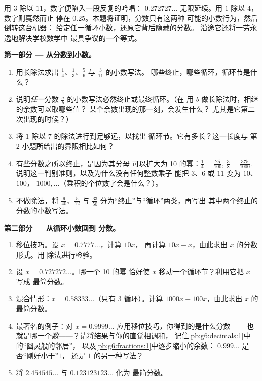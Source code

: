\begin{problem}
\label{pb:g9:fractions:1}
用 $3$ 除以 $11$，数字便陷入一段反复的吟唱：
$0.272727\ldots$ 无限延续。用 $1$ 除以 $4$，数字则戛然而止
停在 $0.25$。本题将证明，分数只有这两种
可能的小数行为，然后倒转这台机器：
给定任一循环小数，还原它背后隐藏的分数。
沿途它还将一劳永逸地解决学校数学中
最具争议的一个等式。

\medskip
\noindent\textbf{第一部分 --- 从分数到小数。}
\begin{enumerate}
  \item 用长除法求出
        $\frac14$、$\frac13$、$\frac56$ 与 $\frac{3}{11}$ 的小数写法。
        哪些终止，哪些循环，循环节是什么？
  \item 说明\emph{任一}分数
        $\frac ab$ 的小数写法必然终止或最终循环。（在
        用 $b$ 做长除法时，相继的余数可以取哪些值？
        某个余数出现的那一刻，会发生什么？
        尤其是它第二次出现的时候？）
  \item 将 $1$ 除以 $7$ 的除法进行到足够远，以找出
        循环节。它有多长？这一长度与
        第 2 小题所给出的界限相比如何？
  \item 有些分数之所以终止，是因为其分母
        可以扩大为 10 的幂：$\frac14 =
        \frac{25}{100}$, $\frac{3}{8} = \frac{375}{1000}$.
        说明这一判别准则，以及为什么没有任何整数乘子
        能把 $3$、$6$ 或 $11$ 变为 $10$、$100$，
        $1000, \dots$（乘积的个位数字会是什么？）。
  \item 不做除法，将 $\frac{9}{40}$、$\frac{5}{12}$ 与
        $\frac{33}{50}$ 分为“终止”与“循环”两类，再写出
        其中两个终止的分数的小数写法。
\end{enumerate}

\medskip
\noindent\textbf{第二部分 --- 从循环小数回到
分数。}
\begin{enumerate}[resume]
  \item 移位技巧。设 $x = 0.7777\ldots$，计算 $10x$，
        再计算 $10x - x$，由此求出 $x$ 的分数形式。用
        除法进行检验。
  \item 设 $x = 0.727272\ldots$。哪一个 10 的幂
        恰好使 $x$ 移动一个循环节？利用它把 $x$ 写成
        最简分数。
  \item 混合情形：$x = 0.58333\ldots$（只有 $3$
        循环）。计算 $1000x - 100x$，由此求出 $x$ 的
        最简分数。
  \item 最著名的例子：对
        $x = 0.9999\ldots$ 应用移位技巧，你得到的是什么分数——
        也就是哪一个\emph{数}——？请将结果与你的直觉相调和，
        记住\cref{pb:g6:decimals:1}中的“幽灵般的邻居”，
        以及\cref{pb:g6:fractions:1}中逐步缩小的余数：
        $0.999\ldots$ 是否“刚好小于”$1$，
        还是 $1$ 的另一种写法？
  \item 将 $2.454545\ldots$ 与 $0.123123123\ldots$ 化为
        最简分数。
\end{enumerate}


\end{problem}
